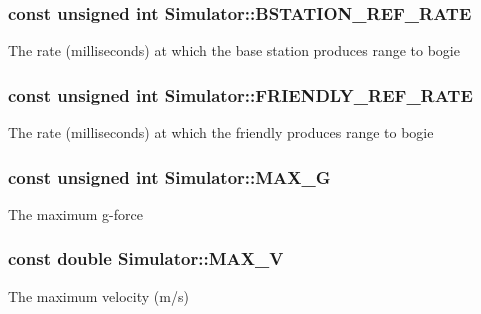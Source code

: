 \subsubsection[{\texorpdfstring{B\+S\+T\+A\+T\+I\+O\+N\+\_\+\+R\+E\+F\+\_\+\+R\+A\+TE}{BSTATION_REF_RATE}}]{\setlength{\rightskip}{0pt plus 5cm}const unsigned int Simulator\+::\+B\+S\+T\+A\+T\+I\+O\+N\+\_\+\+R\+E\+F\+\_\+\+R\+A\+TE\hspace{0.3cm}{\ttfamily [static]}}\hypertarget{classSimulator_a901e2a4bee11e07d7276857f95e88f50}{}\label{classSimulator_a901e2a4bee11e07d7276857f95e88f50}
The rate (milliseconds) at which the base station produces range to bogie 
\subsubsection[{\texorpdfstring{F\+R\+I\+E\+N\+D\+L\+Y\+\_\+\+R\+E\+F\+\_\+\+R\+A\+TE}{FRIENDLY_REF_RATE}}]{\setlength{\rightskip}{0pt plus 5cm}const unsigned int Simulator\+::\+F\+R\+I\+E\+N\+D\+L\+Y\+\_\+\+R\+E\+F\+\_\+\+R\+A\+TE\hspace{0.3cm}{\ttfamily [static]}}\hypertarget{classSimulator_a6ed76930f7f1efb8396ffd05189ed000}{}\label{classSimulator_a6ed76930f7f1efb8396ffd05189ed000}
The rate (milliseconds) at which the friendly produces range to bogie 
\subsubsection[{\texorpdfstring{M\+A\+X\+\_\+G}{MAX_G}}]{\setlength{\rightskip}{0pt plus 5cm}const unsigned int Simulator\+::\+M\+A\+X\+\_\+G\hspace{0.3cm}{\ttfamily [static]}}\hypertarget{classSimulator_a798658490c9deedf3eeb62278308d2b3}{}\label{classSimulator_a798658490c9deedf3eeb62278308d2b3}
The maximum g-\/force 
\subsubsection[{\texorpdfstring{M\+A\+X\+\_\+V}{MAX_V}}]{\setlength{\rightskip}{0pt plus 5cm}const double Simulator\+::\+M\+A\+X\+\_\+V\hspace{0.3cm}{\ttfamily [static]}}\hypertarget{classSimulator_ad97409c332a5e261056ee47b84ba5e72}{}\label{classSimulator_ad97409c332a5e261056ee47b84ba5e72}
The maximum velocity (m/s) 
